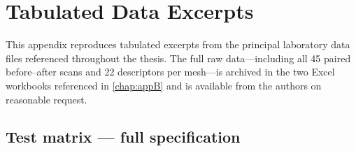\chapter{Tabulated Data Excerpts}
\label{chap:appA}

This appendix reproduces tabulated excerpts from the principal laboratory
data files referenced throughout the thesis. The full raw
data---including all 45 paired before--after scans and 22 descriptors per
mesh---is archived in the two Excel workbooks referenced in
\cref{chap:appB} and is available from the authors on reasonable request.

\section{Test matrix --- full specification}
\label{sec:appA-matrix}

